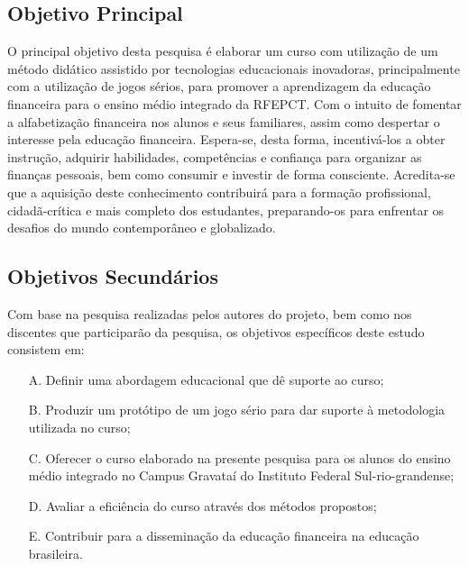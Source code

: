 \subsection{Objetivo Principal}
O principal objetivo desta pesquisa é elaborar um curso com utilização de um método didático assistido por tecnologias educacionais inovadoras, principalmente com a utilização de jogos sérios, para promover a aprendizagem da educação financeira para o ensino médio integrado da RFEPCT. Com o intuito de fomentar a alfabetização financeira nos alunos e seus familiares, assim como despertar o interesse pela educação financeira. Espera-se, desta forma, incentivá-los a obter instrução, adquirir habilidades, competências e confiança para organizar as finanças pessoais, bem como consumir e investir de forma consciente. Acredita-se que a aquisição deste conhecimento contribuirá para a formação profissional, cidadã-crítica e mais completo dos estudantes, preparando-os para enfrentar os desafios do mundo contemporâneo e globalizado.

\subsection{Objetivos Secundários}
Com base na pesquisa realizadas pelos autores do projeto, bem como nos discentes que participarão da pesquisa, os objetivos específicos deste estudo consistem em:

\begin{enumerate}
    \item [A.] Definir uma abordagem educacional que dê suporte ao curso;
    \item [B.] Produzir um protótipo de um jogo sério para dar suporte à metodologia utilizada no curso;
    \item [C.] Oferecer o curso elaborado na presente pesquisa para os alunos do ensino médio integrado no Campus Gravataí do Instituto Federal Sul-rio-grandense;
    \item [D.] Avaliar a eficiência do curso através dos métodos propostos;
    \item [E.] Contribuir para a disseminação da educação financeira na educação brasileira.
\end{enumerate}

